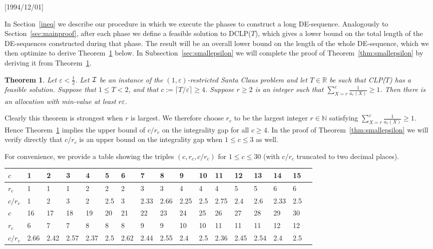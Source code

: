 \NeedsTeXFormat{LaTeX2e}[1994/12/01]\documentclass[letterpaper, 11pt]{article}
\newtheorem{thm}{Theorem}[section]
\theoremstyle{definition}
\theoremstyle{remark}
\numberwithin{equation}{section}
\begin{document}
  In Section~\ref{ineq} we describe our procedure in which we execute the phases to construct a long DE-sequence. Analogously to Section~\ref{sec:mainproof}, after each phase we define a feasible solution to DCLP($T$), which gives a lower bound on the total length of the DE-sequences constructed during that phase. 
 The result will be an overall lower bound on the length of the whole DE-sequence, which we then optimize to derive 
Theorem~\ref{thm:2val} below. 
In Subsection~\ref{sec:smallepsilon} we will complete the proof of Theorem~\ref{thm:smallepsilon} by deriving it from Theorem~\ref{thm:2val}.

\begin{thm}\label{thm:2val} Let $\varepsilon < \frac{1}{2}$. Let
  ${\cal I}$ be an instance of
  the $(1,\varepsilon)$-restricted Santa Claus problem
and let $T\in \mathbb{R}$ be such that CLP($T$) has a feasible
solution. Suppose that $1\leq T<  2$, and that
$c :=\lceil T/\varepsilon\rceil\geq 4$. 
Suppose $r\geq 2$ is an integer such that $\sum_{X=r}^c
\frac{1}{a_r(X)} \geq 1$. 
Then there is an allocation with
min-value at least $r\varepsilon$.
\end{thm}


Clearly this theorem is strongest when $r$ is
  largest. We therefore choose $r_c$ to be the largest integer $r \in
\mathbb{N}$ 
satisfying $\sum_{X=r}^c \frac{1}{a_r(X)} \geq
1$. Hence Theorem~\ref{thm:2val} implies the upper bound of $c/r_c$ on the integrality gap for all $c\geq 4$.
In the proof of Theorem~\ref{thm:smallepsilon} we will verify directly that
$c/r_c$ is an upper bound on the integrality gap when $1\leq c\leq 3$ as well.

For convenience, we provide a table showing the triples $(c,r_c,c/r_c)$ for $1\leq c\leq30$ (with $c/r_c$ truncated to two decimal places).

\begin{center}
\smallskip
\begin{small}
\begin{tabular}{|l|l|l|l|l|l|l|l|l|l|l|l|l|l|l|l|l|}
\hline {$c$}&1&2&3&4&5&6&7&8&9&10&11&12&13&14&15\\
\hline {$r_c$}&1&1&1&2&2&2&3&3&4&4&4&5&5&6&6\\
\hline {$c/r_c$}&1&2&3&2 &2.5 &3 &2.33&2.66&2.25&2.5&2.75&2.4&2.6&2.33&2.5\\
\hline
\hline {$c$}&16&17&18&19&20&21&22&23&24&25&26&27&28&29&30\\\hline {$r_c$}&6&7&7&8&8&8&9&9&10&10&11&11&11&12&12\\\hline {$c/r_c$}&2.66&2.42&2.57&2.37&2.5&2.62&2.44&2.55&2.4 &2.5 &2.36 &2.45&2.54&2.4&2.5\\\hline 

 \end{tabular}
\end{small}
\smallskip
\end{center}
\end{document}
